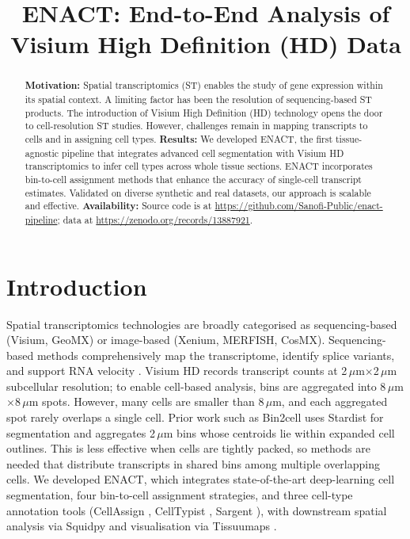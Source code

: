 \documentclass[11pt]{article}
\title{ENACT: End-to-End Analysis of Visium High Definition (HD) Data}
\author{}
\date{}
\begin{document}
\maketitle

\begin{abstract}
\textbf{Motivation:} Spatial transcriptomics (ST) enables the study of gene expression within its spatial context. A limiting factor has been the resolution of sequencing-based ST products. The introduction of Visium High Definition (HD) technology opens the door to cell-resolution ST studies. However, challenges remain in mapping transcripts to cells and in assigning cell types. \textbf{Results:} We developed ENACT, the first tissue-agnostic pipeline that integrates advanced cell segmentation with Visium HD transcriptomics to infer cell types across whole tissue sections. ENACT incorporates bin-to-cell assignment methods that enhance the accuracy of single-cell transcript estimates. Validated on diverse synthetic and real datasets, our approach is scalable and effective. \textbf{Availability:} Source code is at \url{https://github.com/Sanofi-Public/enact-pipeline}; data at \url{https://zenodo.org/records/13887921}.
\end{abstract}

\section{Introduction}
Spatial transcriptomics technologies are broadly categorised as sequencing-based (Visium, GeoMX) or image-based (Xenium, MERFISH, CosMX). Sequencing-based methods comprehensively map the transcriptome, identify splice variants, and support RNA velocity \citep{r1}. Visium HD \citep{r2} records transcript counts at 2\,$\mu$m$\times$2\,$\mu$m subcellular resolution; to enable cell-based analysis, bins are aggregated into 8\,$\mu$m$\times$8\,$\mu$m spots. However, many cells are smaller than 8\,$\mu$m, and each aggregated spot rarely overlaps a single cell. Prior work such as Bin2cell \citep{r3} uses Stardist \citep{r4} for segmentation and aggregates 2\,$\mu$m bins whose centroids lie within expanded cell outlines. This is less effective when cells are tightly packed, so methods are needed that distribute transcripts in shared bins among multiple overlapping cells. We developed ENACT, which integrates state-of-the-art deep-learning cell segmentation, four bin-to-cell assignment strategies, and three cell-type annotation tools (CellAssign \citep{r5}, CellTypist \citep{r6}, Sargent \citep{r7}), with downstream spatial analysis via Squidpy \citep{r8} and visualisation via Tissuumaps \citep{r9}.
\end{document}

